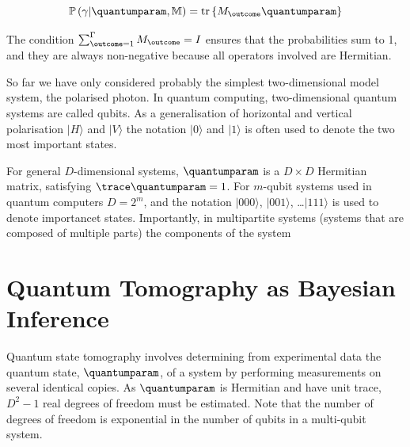 \begin{equation}
	\mathbb{P}\left(\gamma\vert\quantumparam,\mathbb{M}\right) = \text{tr}\left\{M_{\outcome}\quantumparam \right\}\label{eqn:born}\notag
\end{equation}

The condition $\sum_{\outcome=1}^{\Gamma} M_{\outcome} = I$ ensures that the probabilities sum to 1, and they are always non-negative because all operators involved are Hermitian.

So far we have only considered probably the simplest two-dimensional model system, the polarised photon. In quantum computing, two-dimensional quantum systems are called qubits. As a generalisation of horizontal and vertical polarisation $\vert H \rangle$ and $\vert V \rangle$ the notation $\vert 0 \rangle$ and $\vert 1 \rangle$ is often used to denote the two most important states.

For general $D$-dimensional systems, $\quantumparam$ is a $D \times D$ Hermitian matrix, satisfying $\trace\quantumparam = 1$. For $m$-qubit systems used in quantum computers $D=2^m$, and the notation $\vert 000 \rangle$, $\vert 001 \rangle$, \ldots $\vert 111 \rangle$ is used to denote importancet states. Importantly, in multipartite systems (systems that are composed of multiple parts) the components of the system 


\section{Quantum Tomography as Bayesian Inference}

Quantum state tomography involves determining from experimental data the quantum state, $\quantumparam$, of a system by performing measurements on several identical copies. As $\quantumparam$ is Hermitian and have unit trace, $D^2-1$ real degrees of freedom must be estimated. Note that the number of degrees of freedom is exponential in the number of qubits in a multi-qubit system.

